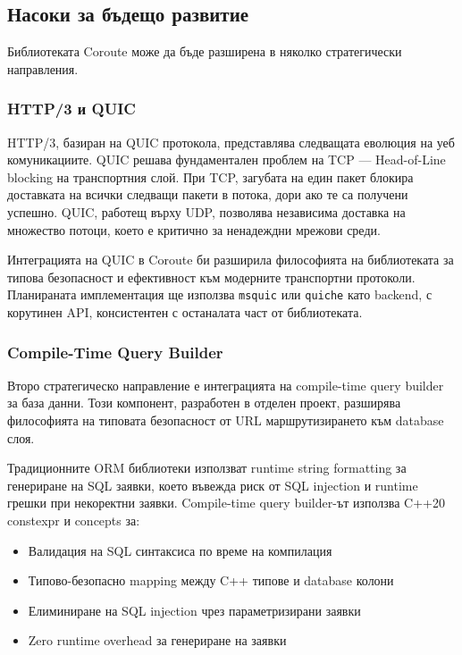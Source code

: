 \subsection{Насоки за бъдещо развитие}

Библиотеката Coroute може да бъде разширена в няколко стратегически направления.

\subsubsection{HTTP/3 и QUIC}

HTTP/3, базиран на QUIC протокола, представлява следващата еволюция на уеб комуникациите. QUIC решава фундаментален проблем на TCP --- Head-of-Line blocking на транспортния слой. При TCP, загубата на един пакет блокира доставката на всички следващи пакети в потока, дори ако те са получени успешно. QUIC, работещ върху UDP, позволява независима доставка на множество потоци, което е критично за ненадеждни мрежови среди.

Интеграцията на QUIC в Coroute би разширила философията на библиотеката за типова безопасност и ефективност към модерните транспортни протоколи. Планираната имплементация ще използва \texttt{msquic} или \texttt{quiche} като backend, с корутинен API, консистентен с останалата част от библиотеката.

\subsubsection{Compile-Time Query Builder}

Второ стратегическо направление е интеграцията на compile-time query builder за база данни. Този компонент, разработен в отделен проект, разширява философията на типовата безопасност от URL маршрутизирането към database слоя.

Традиционните ORM библиотеки използват runtime string formatting за генериране на SQL заявки, което въвежда риск от SQL injection и runtime грешки при некоректни заявки. Compile-time query builder-ът използва C++20 constexpr и concepts за:
\begin{itemize}
    \item Валидация на SQL синтаксиса по време на компилация
    \item Типово-безопасно mapping между C++ типове и database колони
    \item Елиминиране на SQL injection чрез параметризирани заявки
    \item Zero runtime overhead за генериране на заявки
\end{itemize}

